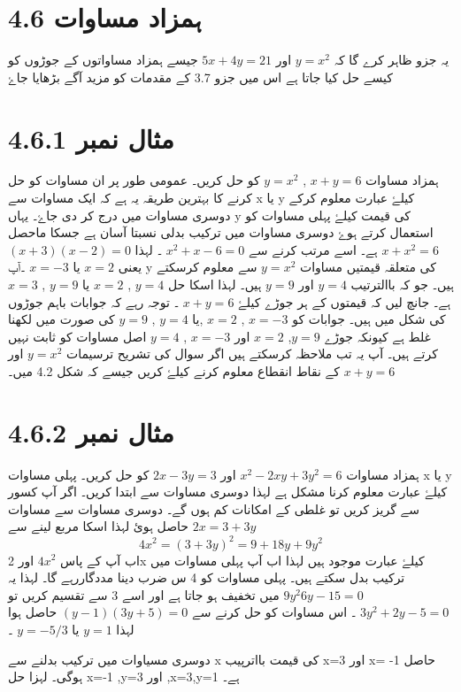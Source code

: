 \section{4.6 ہمزاد مساوات}
يہ جزو ظاہر کرے گا کہ $y=x^2 $ اور $ 5x+4y=21 $ جيسے ہمزاد مساواتوں کے جوڑوں کو کيسے حل کيا جاتا ہے اس ميں جزو 3.7 کے مقدمات کو مزيد آگے بڑھايا جاۓ 
\section{مثال نمبر 4.6.1}
ہمزاد مساوات $ x+y=6 $ , $ y=x^2 $  کو حل کريں۔
عمومی طور پر ان مساوات کو حل کرنے کا بہترين طريقہ يہ ہے کہ ايک مساوات سے x يا y کيلۓ عبارت معلوم کرکے دوسری مساوات ميں درج کر دی جاۓ۔ يہاں y کی قيمت کيلۓ پہلی مساوات کو استعمال کرتے ہوۓ دوسری مساوات ميں ترکيب بدلی نسبتا آسان ہے جسکا ماحصل $ x+x^2=6 $ ہے۔ اسے مرتب کرنے سے $ x^2+x-6=0 $ ۔ لہذا $ (x+3)(x-2)=0 $ يعنی $ x=2 $ يا $ x=-3 $ ۔آپ y کی متعلقہ قيمتيں مساوات $ y=x^2 $ سے معلوم کرسکتے ہيں۔ جو کہ باالترتيب $ y=4 $ اور $ y=9 $ ہيں۔ 
لہذا اسکا حل $ y=4 $ , $ x=2 $ يا $ y=9 $ , $ x=3 $ ہے۔ جانچ ليں کہ قيمتوں کے ہر جوڑے کيلۓ $ x+y=6 $ ۔ توجہ رہے کہ جوابات باہم جوڑوں کی شکل ميں ہيں۔ جوابات کو $ x=-3 $ , $ x=2 $ ,يا $ y=4 $ , $ y=9 $ کی صورت ميں لکھنا غلط ہے کيونکہ جوڑے $ y=9 $, $ x=2 $ اور $ x=-3 $ , $ y=4 $ اصل مساوات کو ثابت نہيں کرتے ہيں۔ 
آپ يہ تب ملاحظہ کرسکتے ہيں اگر سوال کی تشريح ترسيمات
$ y=x^2$
اور
$ x+y=6 $
کے نقاط انقطاع معلوم کرنے کيلۓ کريں جيسے کہ شکل 4.2 ميں۔
\section{ مثال نمبر 4.6.2}
ہمزاد مساوات $ x^2-2xy+3y^2=6 $ اور $ 2x-3y=3 $ کو حل کريں۔
پہلی مساوات x يا y کيلۓ عبارت معلوم کرنا مشکل ہے لہذا دوسری مساوات سے ابتدا کريں۔
اگر آپ کسور سے گريز کريں تو غلطی کے امکانات کم ہوں گے۔ دوسری مساوات سے مساوات $ 2x=3+3y $ حاصل ہوئ لہذا اسکا مربع لينے سے $$ 4x^2=(3+3y)^2=9+18y+9y^2 $$ 
اب آپ کے پاس 
$4x^2$
 اور 2x کيلۓ عبارت موجود ہيں لہذا اب آپ پہلی مساوات ميں ترکيب بدل سکتے ہيں۔ پہلی مساوات کو 4 س ضرب دينا مددگاررہے گا۔ لہذا يہ $ 9y^2 6y-15=0 $ ميں تخفيف ہو جاتا ہے اور اسے 3 سے تقسيم کريں تو $ 3y^2+2y-5=0 $ ۔ اس مساوات کو حل کرنے سے $ (y-1)(3y+5)=0 $ حاصل ہوا لہذا $ y=1 $ يا $ y=-5/3 $ ۔
   
 
دوسرى  مسياوات  میں  ترکیب  بدلنے سے ‌‌‌x  کی قیمت بااترپیب x=3 اور x= -1 حاصل ہوگی۔ لہزا حل  x=-1 ,y=3 اور ,x=3,y=1 ہے۔
